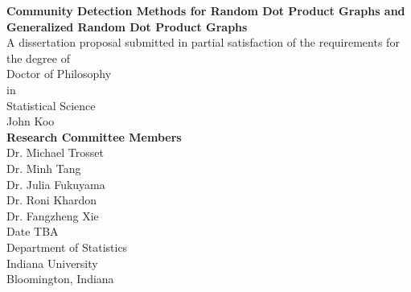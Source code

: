 \documentclass[
  11pt,
]{article}
\author{}
\date{\vspace{-2.5em}}
\begin{document}

\begin{center}
\LARGE{\textbf{Community Detection Methods for Random Dot Product Graphs and Generalized Random Dot Product Graphs}}\\
\vspace*{2\baselineskip}
\normalsize{A dissertation proposal submitted in partial satisfaction of the requirements for the degree of \\}
Doctor of Philosophy \\
in \\
Statistical Science \\
\vspace*{2\baselineskip}
\Large{John Koo}\\
\vspace*{3\baselineskip}
\Large{\textbf{Research Committee Members}}\\
Dr. Michael Trosset \\
Dr. Minh Tang \\
Dr. Julia Fukuyama \\
Dr. Roni Khardon \\
Dr. Fangzheng Xie \\
\vspace*{3\baselineskip}
Date TBA \\
\vspace*{1\baselineskip}
Department of Statistics \\
Indiana University \\
Bloomington, Indiana \\
\end{center}

\hypersetup{linkcolor = black}
\newpage
{}
\tableofcontents
{}

\newpage

\newpage
{}
\hypersetup{linkcolor = blue}

\newcommand{\diag}{\text{diag}}
\newcommand{\tr}{\text{Tr}}
\newcommand{\blockdiag}{\text{blockdiag}}
\newcommand{\indep}{\stackrel{\text{indep}}{\sim}}
\newcommand{\iid}{\stackrel{\text{iid}}{\sim}}
\newcommand{\Bernoulli}{\text{Bernoulli}}
\newcommand{\Betadist}{\text{Beta}}
\newtheorem{definition}{Definition}
\newtheorem{theorem}{Theorem}
\newtheorem{lemma}{Lemma}
\theoremstyle{remark}
\newtheorem*{remark}{Remark}
\theoremstyle{example}
\newtheorem*{example}{Example}
\end{document}
